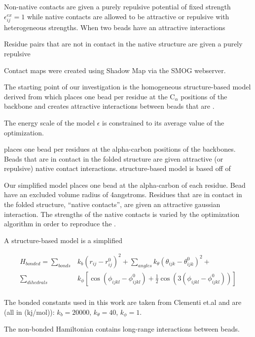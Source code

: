 \documentclass[preprint]{elsarticle}
\begin{document}
    Non-native contacts are given a purely repulsive potential of fixed
strength $\epsilon^{ex}_{ij} = 1$ while native contacts are allowed to be
attractive or repulsive with heterogeneous strengths. When two beads have an 
attractive interactions

Residue pairs that are not in contact in the native structure are given a purely 
repulsive 

 Contact maps were created using Shadow Map\cite{Noel2012} via the SMOG
webserver\cite{Noel2010}. 

    The starting point of our investigation is the homogeneous structure-based
model derived from \cite{Clementi200} which places one bead per residue at the
C$_{\alpha}$ positions of the backbone and creates attractive interactions 
between beads that are . 

    The energy scale of the model $\epsilon$ is constrained to its average
value of the optimization.


places one bead per residues at the alpha-carbon positions of the backbones. Beads that are in contact 
in the folded structure are given attractive (or repulsive) native contact interactions. structure-based model is based off of 



    Our simplified model places one bead at the alpha-carbon of each residue. Bead
have an excluded volume radius of 4angstroms. Residues that are in contact in
the folded structure, ``native contacts'', are given an attractive gaussian interaction. 
The strengths of the native contacts is varied by the optimization algorithm in order
to reproduce the .

A structure-based model is a simplified

\begin{align}
    H_{bonded} = \sum\limits_{bonds} &k_b (r_{ij} - r_{ij}^0)^2 + \sum\limits_{angles} k_{\theta} (\theta_{ijk} - \theta_{ijk}^0)^2 + \\
        \sum\limits_{dihedrals} &k_{\phi} [ \cos(\phi_{ijkl} - \phi_{ijkl}^0) + \frac{1}{2}\cos(3(\phi_{ijkl} - \phi_{ijkl}^0))] \\
\end{align}

    The bonded constants used in this work are taken from Clementi
et.al\cite{Clementi2000} and are (all in (kj/mol)): $k_b = 20000$, $k_{\theta}
= 40$, $k_{\phi} = 1$.

    The non-bonded Hamiltonian contains long-range interactions between beads.
\end{document}
